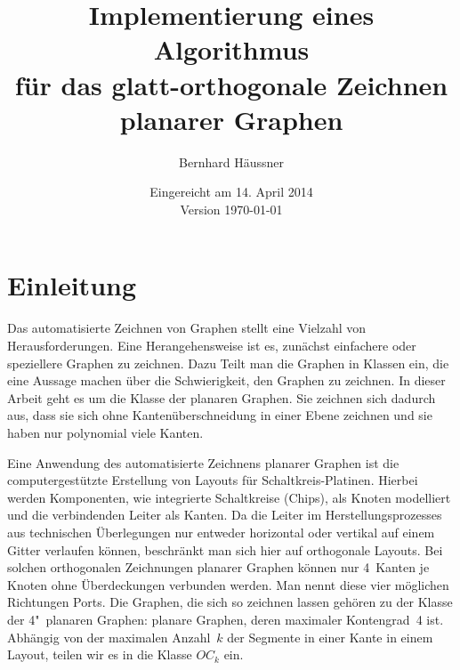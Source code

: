 \documentclass[a4paper]{scrreprt}
\theoremstyle{definition}
\begin{document}


\subject{Bachelorarbeit}
\title{Implementierung eines Algorithmus\\ für das glatt-orthogonale Zeichnen \\ planarer Graphen} %
\author{Bernhard Häussner} %
\date{Eingereicht am 14. April 2014 \\ Version \today} %
\titlehead{Julius-Maximilians-Universität Würzburg\\
Institut für Informatik\\
Lehrstuhl für Informatik I\\
Effiziente Algorithmen und wissensbasierte Systeme}
\publishers{Betreuer:\\
Prof.\ Dr.\ Alexander Wolff\\
Dipl.-Inf.\ Philipp Kindermann} %
\maketitle
\tableofcontents









\chapter{Einleitung}
\label{chap:intro}

Das automatisierte Zeichnen von Graphen stellt eine Vielzahl von Herausforderungen. 
Eine Herangehensweise ist es, zunächst einfachere oder speziellere Graphen zu zeichnen. 
Dazu Teilt man die Graphen in Klassen ein, die eine Aussage machen über die Schwierigkeit, den Graphen zu zeichnen. 
In dieser Arbeit geht es um die Klasse der planaren Graphen. Sie zeichnen sich dadurch aus, dass sie sich ohne Kantenüberschneidung in einer Ebene zeichnen und sie haben nur polynomial viele Kanten.

Eine Anwendung des  automatisierte Zeichnens planarer Graphen ist die computergestützte Erstellung von Layouts für Schaltkreis-Platinen. Hierbei werden Komponenten, wie integrierte Schaltkreise (Chips), als Knoten modelliert und die verbindenden Leiter als Kanten. Da die Leiter im Herstellungsprozesses  aus technischen Überlegungen nur entweder horizontal oder vertikal auf einem Gitter verlaufen können, beschränkt man sich hier auf orthogonale Layouts. Bei solchen orthogonalen Zeichnungen planarer Graphen können nur 4~Kanten je Knoten ohne Überdeckungen verbunden werden. Man nennt diese vier möglichen Richtungen Ports. Die Graphen, die sich so zeichnen lassen gehören zu der Klasse der 4"~planaren Graphen: planare Graphen, deren maximaler Kontengrad~4 ist. Abhängig von der maximalen Anzahl~$k$ der Segmente in einer Kante in einem Layout, teilen wir es in die Klasse $OC_k$ ein.
\end{document}
